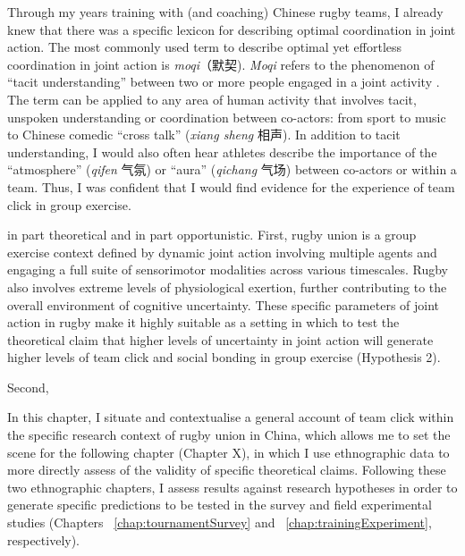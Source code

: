 \begin{CJK}{UTF8}{gbsn}
Through my years training with (and coaching) Chinese rugby teams, I already knew that there was a specific lexicon for describing optimal coordination in joint action.  The most commonly used term to describe optimal yet effortless coordination in joint action is \textit{moqi}（默契).  \textit{Moqi} refers to the phenomenon of ``tacit understanding'' between two or more people engaged in a joint activity \citep{Pleco2018}. The term can be applied to any area of human activity that involves tacit, unspoken understanding or coordination between co-actors: from sport to music to Chinese comedic ``cross talk'' (\textit{xiang sheng} 相声).  In addition to tacit understanding, I would also often hear athletes describe the importance of the ``atmosphere'' (\textit{qifen} 气氛) or ``aura'' (\textit{qichang} 气场) between co-actors or within a team.  Thus, I was confident that I would find evidence for the experience of team click in group exercise.

 in part theoretical and in part opportunistic.  First, rugby union is a group exercise context defined by dynamic joint action involving multiple agents and engaging a full suite of sensorimotor modalities across various timescales.  Rugby also involves extreme levels of physiological exertion, further contributing to the overall environment of cognitive uncertainty.  These specific parameters of joint action in rugby make it highly suitable as a setting in which to test the theoretical claim that higher levels of uncertainty in joint action will generate higher levels of team click and social bonding in group exercise (Hypothesis 2).

Second,



In this chapter, I situate and contextualise a general account of team click within the specific research context of rugby union in China, which allows me to set the scene for the following chapter (Chapter X), in which I use ethnographic data to more directly assess of the validity of specific theoretical claims.  Following these two ethnographic chapters, I assess results against research hypotheses in order to generate specific predictions to be tested in the survey and field experimental studies (Chapters ~\ref{chap:tournamentSurvey} and ~\ref{chap:trainingExperiment}, respectively).



\end{CJK}
